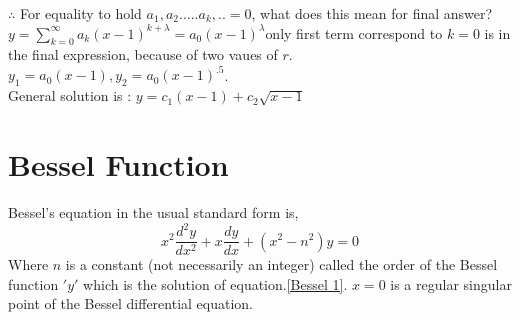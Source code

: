 $\therefore$ For equality to hold $a_1,a_2.....a_k,..=0$, what does this mean for final answer?\\
$y=\sum_{k=0}^{\infty} a_{k}(x-1)^{k+\lambda}=a_{0}(x-1)^{\lambda}$only first term correspond to $k=0$ is in the final expression, because of two vaues of $r$. \\ $y_1=a_{0}(x-1), y_{2}=a_{0}(x-1)^{.5}$.\\ General solution is : $y=c_{1}(x-1)+c_{2} \sqrt{x-1}$
\section{Bessel Function}
Bessel’s equation in the usual standard form is,
\begin{equation}
x^{2} \frac{d^{2} y}{d x^{2}}+x \frac{d y}{d x}+\left(x^{2}-n^{2}\right) y=0 \label{Bessel 1}
\end{equation}
Where $n$ is a constant (not necessarily an integer) called the order of the Bessel function $'y'$ which is the solution of equation.\ref{Bessel 1}. $x=0$ is a regular singular point of the Bessel differential equation.

